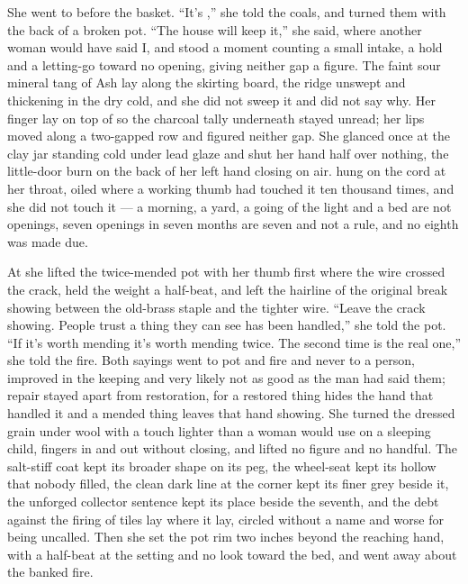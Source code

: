 She went to  before the basket. “It's ,” she told the coals, and turned them with the back of a broken pot. “The house will keep it,” she said, where another woman would have said I, and stood a moment counting a small intake, a hold and a letting-go toward no opening, giving neither gap a figure. The faint sour mineral tang of Ash lay along the skirting board, the ridge unswept and thickening in the dry cold, and she did not sweep it and did not say why. Her finger lay on top of  so the charcoal tally underneath stayed unread; her lips moved along a two-gapped row and figured neither gap. She glanced once at the clay jar standing cold under lead glaze and shut her hand half over nothing, the little-door burn on the back of her left hand closing on air.  hung on the cord at her throat, oiled where a working thumb had touched it ten thousand times, and she did not touch it --- a morning, a yard, a going of the light and a bed are not openings, seven openings in seven months are seven and not a rule, and no eighth was made due.

At  she lifted the twice-mended pot with her thumb first where the wire crossed the crack, held the weight a half-beat, and left the hairline of the original break showing between the old-brass staple and the tighter wire. “Leave the crack showing. People trust a thing they can see has been handled,” she told the pot. “If it's worth mending it's worth mending twice. The second time is the real one,” she told the fire. Both sayings went to pot and fire and never to a person, improved in the keeping and very likely not as good as the man had said them; repair stayed apart from restoration, for a restored thing hides the hand that handled it and a mended thing leaves that hand showing. She turned the dressed grain under wool with a touch lighter than a woman would use on a sleeping child, fingers in and out without closing, and lifted no figure and no handful. The salt-stiff coat kept its broader shape on its peg, the wheel-seat kept its hollow that nobody filled, the clean dark line at the corner kept its finer grey beside it, the unforged collector sentence kept its place beside the seventh, and the debt against the firing of tiles lay where it lay, circled without a name and worse for being uncalled. Then she set the pot rim two inches beyond the reaching hand, with a half-beat at the setting and no look toward the bed, and went away about the banked fire.

